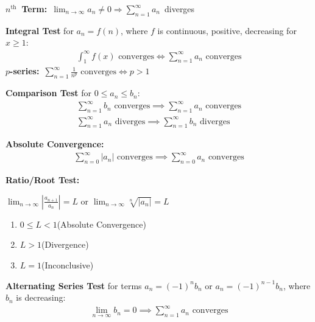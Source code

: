 \documentclass[12pt, a4paper]{article}
\begin{document}
\begin{multicols*}{3}
\mbox{\textbf{$n^{\text{th}}$ Term:} $\displaystyle\lim_{n\rightarrow\infty} a_n\neq 0 \Rightarrow \sum^{\infty}_{n=1}a_n$ diverges}

\textbf{Integral Test} for $a_n = f(n)$, where $f$ is continuous, positive, decreasing for $x \geq 1$:\vspace{-0.5em}
\begin{align*}
  \displaystyle \int^{\infty}_1 f(x)\text{ converges} \iff \sum^{\infty}_{n=1}a_n\text{ converges}
\end{align*}
\mbox{\textbf{$p$-series:} $\displaystyle \sum^{\infty}_{n=1} \frac{1}{n^p}\text{ converges} \iff p > 1$}

\textbf{Comparison Test} for $0 \leq a_n \leq b_n$:\vspace{-0.5em}
\begin{align*}
  \displaystyle \sum^{\infty}_{n=1}b_n\text{ converges}\implies\sum^{\infty}_{n=1}a_n\text{ converges}\\
  \displaystyle \sum^{\infty}_{n=1}a_n\text{ diverges}\implies\sum^{\infty}_{n=1}b_n\text{ diverges}
\end{align*}

\textbf{Absolute Convergence:}\vspace{-0.5em} 
\begin{align*}
\displaystyle\sum^{\infty}_{n=0} |a_n| \text{ converges}\implies \sum^{\infty}_{n=0} a_n \text{ converges}
\end{align*}

\textbf{Ratio/Root Test:}\\
\vspace{0.5em}
{\centering 
  $\displaystyle \lim_{n\rightarrow\infty}\left|\frac{a_{n+1}}{a_n}\right| = L\text{ or }\lim_{n\rightarrow\infty}\sqrt[n]{|a_n|}=L$
\par}
\begin{enumerate}[\roman*.]
  \item $0\leq L<1$\hfill(Absolute Convergence)
  \item $L>1$\hfill(Divergence)
  \item $L=1$\hfill(Inconclusive)
\end{enumerate}
\vspace{0.5em}
\textbf{Alternating Series Test} for terms $a_n = (-1)^{n}b_n$ or $a_n = (-1)^{n-1}b_n$, where $b_n$ is decreasing:\vspace{-0.5em}
\begin{align*}
  \displaystyle\lim_{n\rightarrow\infty}b_n=0 \implies \sum^{\infty}_{n=1}a_n\text{ converges}
\end{align*}


\end{multicols*}
\end{document}
